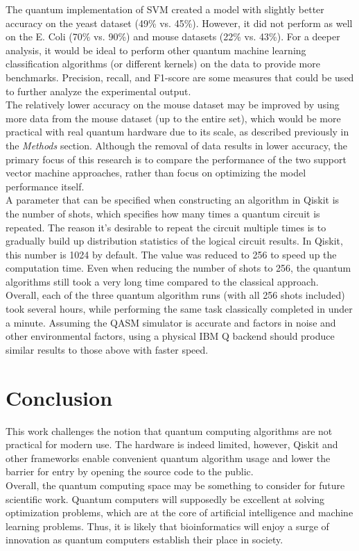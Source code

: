 \documentclass{article}
\begin{document}
  The quantum implementation of SVM created a model with slightly better accuracy on the yeast dataset (49\% vs. 45\%). However, it did not perform as well on the E. Coli (70\% vs. 90\%) and mouse datasets (22\% vs. 43\%). For a deeper analysis, it would be ideal to perform other quantum machine learning classification algorithms (or different kernels) on the data to provide more benchmarks. Precision, recall, and F1-score are some measures that could be used to further analyze the experimental output. \\

  The relatively lower accuracy on the mouse dataset may be improved by using more data from the mouse dataset (up to the entire set), which would be more practical with real quantum hardware due to its scale, as described previously in the \textit{Methods} section. Although the removal of data results in lower accuracy, the primary focus of this research is to compare the performance of the two support vector machine approaches, rather than focus on optimizing the model performance itself. \\

  A parameter that can be specified when constructing an algorithm in Qiskit is the number of shots, which specifies how many times a quantum circuit is repeated. The reason it's desirable to repeat the circuit multiple times is to gradually build up distribution statistics of the logical circuit results. In Qiskit, this number is 1024 by default. The value was reduced to 256 to speed up the computation time. Even when reducing the number of shots to 256, the quantum algorithms still took a very long time compared to the classical approach. Overall, each of the three quantum algorithm runs (with all 256 shots included) took several hours, while performing the same task classically completed in under a minute. Assuming the QASM simulator is accurate and factors in noise and other environmental factors, using a physical IBM Q backend should produce similar results to those above with faster speed.

\section{Conclusion}
  This work challenges the notion that quantum computing algorithms are not practical for modern use. The hardware is indeed limited, however, Qiskit and other frameworks enable convenient quantum algorithm usage and lower the barrier for entry by opening the source code to the public. \\

  Overall, the quantum computing space may be something to consider for future scientific work. Quantum computers will supposedly be excellent at solving optimization problems, which are at the core of artificial intelligence and machine learning problems. Thus, it is likely that bioinformatics will enjoy a surge of innovation as quantum computers establish their place in society.

\newpage

\raggedright

\end{document}
